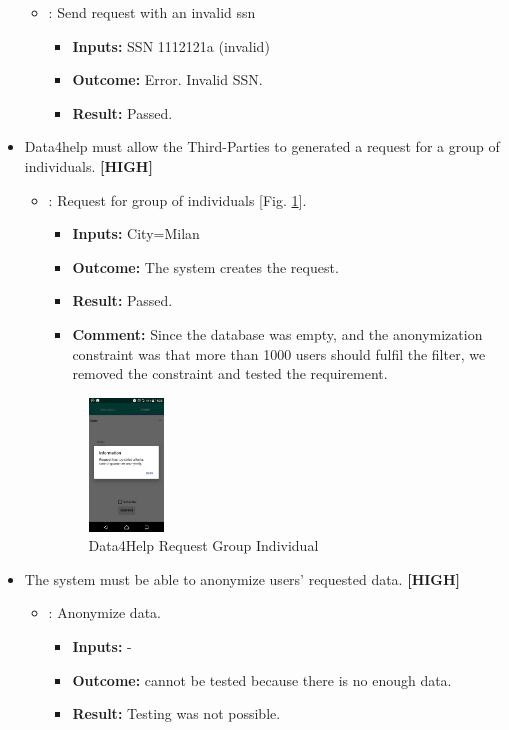 \documentclass[a4paper, hidelinks, 12pt]{report}
\newcommand\requirement[1]{\item[{[REQ-#1]}] }
\newcommand\test[1]{\item[{[TEST-#1]}] }
\begin{document}
\begin{itemize}
\begin{itemize}
		\test{8} : Send request with an invalid ssn
			\begin{itemize}
			\item \textbf{Inputs: } SSN 1112121a (invalid)
			\item \textbf{Outcome: } Error. Invalid SSN.
			\item \textbf{Result: } Passed. 
			 \end{itemize}	
	\end{itemize}
	
	\requirement{10} Data4help must allow the Third-Parties to generated a request for a group of individuals.  \textbf{[HIGH]}
	
						\begin{itemize}
		\test{9}: Request for group of individuals [Fig. \ref{fig:request_group_individuals}].
			\begin{itemize}
			\item \textbf{Inputs: } City=Milan	
			\item \textbf{Outcome: } The system creates the request.
			\item \textbf{Result: } Passed.
			\item \textbf{Comment: } Since the database was empty, and the anonymization constraint was that more than 1000 users should fulfil the filter, we removed the constraint and tested the requirement.    
			\end{itemize}
			\begin{figure}[H]
					\centering
				\includegraphics[width=0.2\textwidth]{images/request_group_individuals.jpeg}
					\caption[Data4Help Request Group Individual]{Data4Help Request Group Individual}
				\label{fig:request_group_individuals}
			\end{figure}

	\end{itemize}
	
	\requirement{11} The system must be able to anonymize users’ requested data. \textbf{[HIGH]}
	\begin{itemize}
		\test{10}: Anonymize data.
			\begin{itemize}
			\item \textbf{Inputs: } -			
			\item \textbf{Outcome: } cannot be tested because there is no enough data.
			\item \textbf{Result: } Testing was not possible. 
			\end{itemize}
			

\end{itemize}
\end{itemize}
\end{document}
